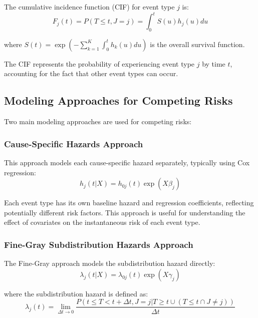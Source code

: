 \begin{definitionbox}[title=Cumulative Incidence Function]
The cumulative incidence function (CIF) for event type $j$ is:
\begin{equation}
    F_j(t) = P(T \leq t, J = j) = \int_0^t S(u) h_j(u) du
\end{equation}

where $S(t) = \exp(-\sum_{k=1}^{K}\int_0^t h_k(u)du)$ is the overall survival function.

The CIF represents the probability of experiencing event type $j$ by time $t$, accounting for the fact that other event types can occur.
\end{definitionbox}

\subsection{Modeling Approaches for Competing Risks}

Two main modeling approaches are used for competing risks:

\subsubsection{Cause-Specific Hazards Approach}

This approach models each cause-specific hazard separately, typically using Cox regression:
\begin{equation}
    h_j(t|X) = h_{0j}(t) \exp(X\beta_j)
\end{equation}

Each event type has its own baseline hazard and regression coefficients, reflecting potentially different risk factors. This approach is useful for understanding the effect of covariates on the instantaneous risk of each event type.

\subsubsection{Fine-Gray Subdistribution Hazards Approach}

The Fine-Gray approach models the subdistribution hazard directly:
\begin{equation}
    \lambda_j(t|X) = \lambda_{0j}(t) \exp(X\gamma_j)
\end{equation}

where the subdistribution hazard is defined as:
\begin{equation}
    \lambda_j(t) = \lim_{\Delta t \to 0} \frac{P(t \leq T < t + \Delta t, J = j | T \geq t \cup (T \leq t \cap J \neq j))}{\Delta t}
\end{equation}

